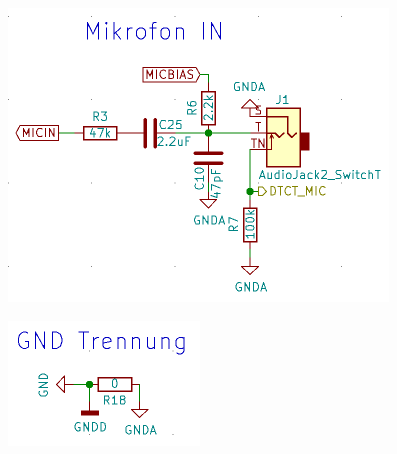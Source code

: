 \begin{figure} [H]
\begin{center}
\includegraphics[scale=0.5]{../graphics/Schema_MicIN.png}
\caption{}
\label{fig:Schema_Codec}
\end{center}
\end{figure}

\begin{figure} [H]
\begin{center}
 \includegraphics[scale=0.5]{../graphics/Schema_GND.png} 
\caption{}
\label{fig:Schema_Codec}
\end{center}
\end{figure}



 